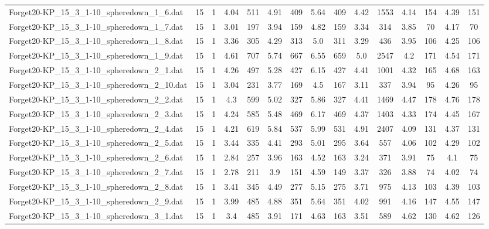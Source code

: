 \begin{table}[!ht]
{\begin{tabular}{lcccccccccccccc}
Forget20-KP\_15\_3\_1-10\_spheredown\_1\_6.dat & 15 & 1 & 4.04 & 511 & 4.91 & 409 & 5.64 & 409 & 4.42 & 1553 & 4.14 & 154 & 4.39 & 151 \\
Forget20-KP\_15\_3\_1-10\_spheredown\_1\_7.dat & 15 & 1 & 3.01 & 197 & 3.94 & 159 & 4.82 & 159 & 3.34 & 314 & 3.85 & 70 & 4.17 & 70 \\
Forget20-KP\_15\_3\_1-10\_spheredown\_1\_8.dat & 15 & 1 & 3.36 & 305 & 4.29 & 313 & 5.0 & 311 & 3.29 & 436 & 3.95 & 106 & 4.25 & 106 \\
Forget20-KP\_15\_3\_1-10\_spheredown\_1\_9.dat & 15 & 1 & 4.61 & 707 & 5.74 & 667 & 6.55 & 659 & 5.0 & 2547 & 4.2 & 171 & 4.54 & 171 \\
Forget20-KP\_15\_3\_1-10\_spheredown\_2\_1.dat & 15 & 1 & 4.26 & 497 & 5.28 & 427 & 6.15 & 427 & 4.41 & 1001 & 4.32 & 165 & 4.68 & 163 \\
Forget20-KP\_15\_3\_1-10\_spheredown\_2\_10.dat & 15 & 1 & 3.04 & 231 & 3.77 & 169 & 4.5 & 167 & 3.11 & 337 & 3.94 & 95 & 4.26 & 95 \\
Forget20-KP\_15\_3\_1-10\_spheredown\_2\_2.dat & 15 & 1 & 4.3 & 599 & 5.02 & 327 & 5.86 & 327 & 4.41 & 1469 & 4.47 & 178 & 4.76 & 178 \\
Forget20-KP\_15\_3\_1-10\_spheredown\_2\_3.dat & 15 & 1 & 4.24 & 585 & 5.48 & 469 & 6.17 & 469 & 4.37 & 1403 & 4.33 & 174 & 4.45 & 167 \\
Forget20-KP\_15\_3\_1-10\_spheredown\_2\_4.dat & 15 & 1 & 4.21 & 619 & 5.84 & 537 & 5.99 & 531 & 4.91 & 2407 & 4.09 & 131 & 4.37 & 131 \\
Forget20-KP\_15\_3\_1-10\_spheredown\_2\_5.dat & 15 & 1 & 3.44 & 335 & 4.41 & 293 & 5.01 & 295 & 3.64 & 557 & 4.06 & 102 & 4.29 & 102 \\
Forget20-KP\_15\_3\_1-10\_spheredown\_2\_6.dat & 15 & 1 & 2.84 & 257 & 3.96 & 163 & 4.52 & 163 & 3.24 & 371 & 3.91 & 75 & 4.1 & 75 \\
Forget20-KP\_15\_3\_1-10\_spheredown\_2\_7.dat & 15 & 1 & 2.78 & 211 & 3.9 & 151 & 4.59 & 149 & 3.37 & 326 & 3.88 & 74 & 4.02 & 74 \\
Forget20-KP\_15\_3\_1-10\_spheredown\_2\_8.dat & 15 & 1 & 3.41 & 345 & 4.49 & 277 & 5.15 & 275 & 3.71 & 975 & 4.13 & 103 & 4.39 & 103 \\
Forget20-KP\_15\_3\_1-10\_spheredown\_2\_9.dat & 15 & 1 & 3.99 & 485 & 4.88 & 351 & 5.64 & 351 & 4.02 & 991 & 4.16 & 147 & 4.55 & 147 \\
Forget20-KP\_15\_3\_1-10\_spheredown\_3\_1.dat & 15 & 1 & 3.4 & 485 & 3.91 & 171 & 4.63 & 163 & 3.51 & 589 & 4.62 & 130 & 4.62 & 126 \\

\end{tabular}}
\end{table}
